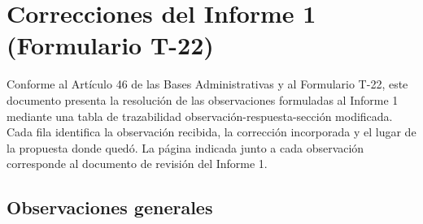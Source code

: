 \documentclass[11pt]{article}
\begin{document}
\section{Correcciones del Informe 1 (Formulario T-22)}\label{anexo-correcciones-informe-1}

Conforme al Artículo 46 de las Bases Administrativas y al Formulario T-22, este documento presenta la resolución de las observaciones formuladas al Informe 1 mediante una tabla de trazabilidad observación-respuesta-sección modificada. Cada fila identifica la observación recibida, la corrección incorporada y el lugar de la propuesta donde quedó. La página indicada junto a cada observación corresponde al documento de revisión del Informe 1.

\renewcommand{\tablename}{Tabla}

\subsection{Observaciones generales}\label{t22-1}
\end{document}
